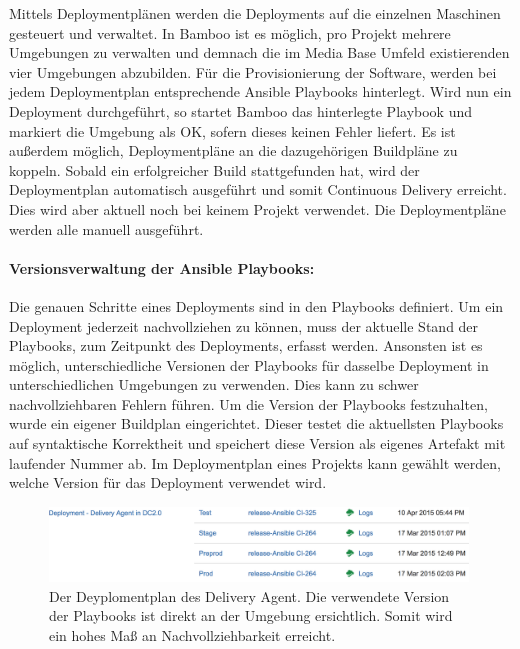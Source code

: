 Mittels Deploymentplänen werden die Deployments auf die einzelnen Maschinen gesteuert und verwaltet. In Bamboo ist es möglich, pro Projekt mehrere Umgebungen zu verwalten und demnach die im Media Base Umfeld existierenden vier Umgebungen abzubilden. Für die Provisionierung der Software, werden bei jedem Deploymentplan entsprechende Ansible Playbooks hinterlegt. Wird nun ein Deployment durchgeführt, so startet Bamboo das hinterlegte Playbook und markiert die Umgebung als OK, sofern dieses keinen Fehler liefert. Es ist außerdem möglich, Deploymentpläne an die dazugehörigen Buildpläne zu koppeln. Sobald ein erfolgreicher Build stattgefunden hat, wird der Deploymentplan automatisch ausgeführt und somit Continuous Delivery erreicht. Dies wird aber aktuell noch bei keinem Projekt verwendet. Die Deploymentpläne werden alle manuell ausgeführt.

\paragraph{Versionsverwaltung der Ansible Playbooks:} Die genauen Schritte eines Deployments sind in den Playbooks definiert. Um ein Deployment jederzeit nachvollziehen zu können, muss der aktuelle Stand der Playbooks, zum Zeitpunkt des Deployments, erfasst werden. Ansonsten ist es möglich, unterschiedliche Versionen der Playbooks für dasselbe Deployment in unterschiedlichen Umgebungen zu verwenden. Dies kann zu schwer nachvollziehbaren Fehlern führen. Um die Version der Playbooks festzuhalten, wurde ein eigener Buildplan eingerichtet. Dieser testet die aktuellsten Playbooks auf syntaktische Korrektheit und speichert diese Version als eigenes Artefakt mit laufender Nummer ab. Im Deploymentplan eines Projekts kann gewählt werden, welche Version für das Deployment verwendet wird.

\begin{figure}[ht]
	\centering
	\includegraphics[width=0.99\textwidth]{img/da_deployment.png}
	\caption[Deploymentplan des Delivery Agent]{Der Deyplomentplan des Delivery Agent. Die verwendete Version der Playbooks ist direkt an der Umgebung ersichtlich. Somit wird ein hohes Maß an Nachvollziehbarkeit erreicht.}
	\label{fig:deployment:da}
\end{figure} 

